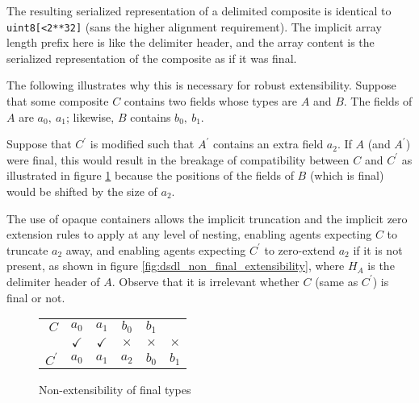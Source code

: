 \begin{remark}
    The resulting serialized representation of a delimited composite is identical to \verb|uint8[<2**32]|
    (sans the higher alignment requirement).
    The implicit array length prefix here is like the delimiter header,
    and the array content is the serialized representation of the composite as if it was final.

    The following illustrates why this is necessary for robust extensibility.
    Suppose that some composite $C$ contains two fields whose types are $A$ and $B$.
    The fields of $A$ are $a_0,\ a_1$;
    likewise, $B$ contains $b_0,\ b_1$.

    Suppose that $C^\prime$ is modified such that $A^\prime$ contains an extra field $a_2$.
    If $A$ (and $A^\prime$) were final, this would result in the breakage of compatibility between $C$ and $C^\prime$
    as illustrated in figure \ref{fig:dsdl_final_non_extensibility} because the positions of the fields of $B$
    (which is final) would be shifted by the size of $a_2$.

    The use of opaque containers allows the implicit truncation and the implicit zero extension rules to apply
    at any level of nesting, enabling agents expecting $C$ to truncate $a_2$ away,
    and enabling agents expecting $C^\prime$ to zero-extend $a_2$
    if it is not present, as shown in figure \ref{fig:dsdl_non_final_extensibility},
    where $H_A$ is the delimiter header of $A$.
    Observe that it is irrelevant whether $C$ (same as $C^\prime$) is final or not.

    \begin{figure}[H]
        \centering
        \begin{tabular}{r c c c c c}
            \cline{2-5}
            $C$ &
            \multicolumn{1}{|c|}{$a_0$} & \multicolumn{1}{c|}{$a_1$}
            &\multicolumn{1}{c|}{$b_0$} & \multicolumn{1}{c|}{$b_1$} &
            \\\cline{2-5}
            & $\checkmark$ & $\checkmark$ & $\times$ & $\times$ & $\times$ \\
            \cline{2-6}
            $C^\prime$ &
            \multicolumn{1}{|c|}{$a_0$} & \multicolumn{1}{c|}{$a_1$} & \multicolumn{1}{c|}{$a_2$}
            &\multicolumn{1}{c|}{$b_0$} & \multicolumn{1}{c|}{$b_1$}
            \\\cline{2-6}
        \end{tabular}
        \caption{Non-extensibility of final types}
        \label{fig:dsdl_final_non_extensibility}
    \end{figure}


\end{remark}
